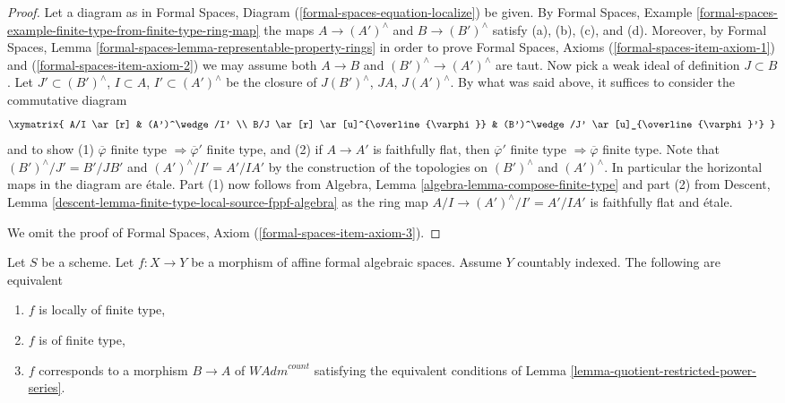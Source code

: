 \begin{proof}
\medskip\noindent
Let a diagram as in
Formal Spaces, Diagram (\ref{formal-spaces-equation-localize})
be given. By Formal Spaces, Example
\ref{formal-spaces-example-finite-type-from-finite-type-ring-map}
the maps $A \to (A')^\wedge$ and $B \to (B')^\wedge$
satisfy (a), (b), (c), and (d). Moreover, by
Formal Spaces, Lemma \ref{formal-spaces-lemma-representable-property-rings}
in order to prove Formal Spaces, Axioms (\ref{formal-spaces-item-axiom-1})
and (\ref{formal-spaces-item-axiom-2})
we may assume both $A \to B$ and $(B')^\wedge \to (A')^\wedge$
are taut. Now pick a weak ideal of definition $J \subset B$. Let
$J' \subset (B')^\wedge$, $I \subset A$, $I' \subset (A')^\wedge$
be the closure of $J(B')^\wedge$, $JA$, $J(A')^\wedge$.
By what was said above, it suffices to consider the commutative
diagram
$$
\xymatrix{
A/I \ar[r] & (A')^\wedge/I' \\
B/J \ar[r] \ar[u]^{\overline{\varphi}} &
(B')^\wedge/J' \ar[u]_{\overline{\varphi}'}
}
$$
and to show (1) $\overline{\varphi}$ finite type
$\Rightarrow \overline{\varphi}'$
finite type, and (2) if $A \to A'$ is faithfully flat, then
$\overline{\varphi}'$ finite type $\Rightarrow \overline{\varphi}$
finite type. Note that $(B')^\wedge/J' = B'/JB'$ and
$(A')^\wedge/I' = A'/IA'$ by the construction of the topologies on
$(B')^\wedge$ and $(A')^\wedge$. In particular the horizontal
maps in the diagram are \'etale. Part (1) now follows from
Algebra, Lemma \ref{algebra-lemma-compose-finite-type}
and part (2) from
Descent, Lemma \ref{descent-lemma-finite-type-local-source-fppf-algebra}
as the ring map $A/I \to (A')^\wedge/I' = A'/IA'$ is faithfully flat
and \'etale.

\medskip\noindent
We omit the proof of Formal Spaces, Axiom (\ref{formal-spaces-item-axiom-3}).
\end{proof}


\begin{lemma}
\label{lemma-representable-affine-finite-type}
Let $S$ be a scheme. Let $f : X \to Y$ be a morphism of
affine formal algebraic spaces. Assume $Y$ countably indexed.
The following are equivalent
\begin{enumerate}
\item $f$ is locally of finite type,
\item $f$ is of finite type,
\item $f$ corresponds to a morphism $B \to A$ of
$\textit{WAdm}^{count}$ satisfying the equivalent conditions
of Lemma \ref{lemma-quotient-restricted-power-series}.
\end{enumerate}
\end{lemma}

